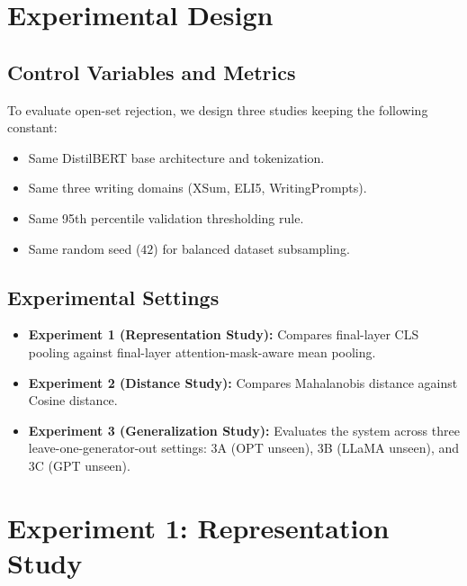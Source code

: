 \documentclass[12pt,a4paper]{report}
\begin{document}
\chapter{Experimental Design}
\label{ch:exp_design}

\section{Control Variables and Metrics}
To evaluate open-set rejection, we design three studies keeping the following constant:
\begin{itemize}
    \item Same DistilBERT base architecture and tokenization.
    \item Same three writing domains (XSum, ELI5, WritingPrompts).
    \item Same 95th percentile validation thresholding rule.
    \item Same random seed ($42$) for balanced dataset subsampling.
\end{itemize}

\section{Experimental Settings}
\begin{itemize}
    \item \textbf{Experiment 1 (Representation Study):} Compares final-layer CLS pooling against final-layer attention-mask-aware mean pooling.
    \item \textbf{Experiment 2 (Distance Study):} Compares Mahalanobis distance against Cosine distance.
    \item \textbf{Experiment 3 (Generalization Study):} Evaluates the system across three leave-one-generator-out settings: 3A (OPT unseen), 3B (LLaMA unseen), and 3C (GPT unseen).
\end{itemize}

\chapter{Experiment 1: Representation Study}
\label{ch:exp1}
\end{document}

